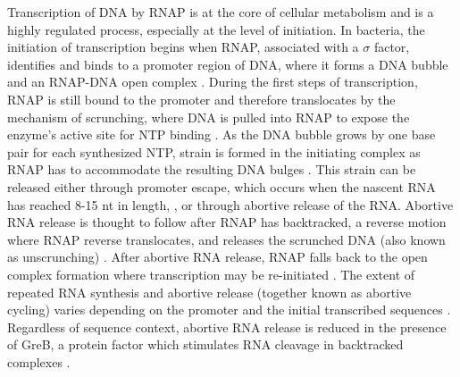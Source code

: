 %
Transcription of DNA by RNAP is at the core of cellular metabolism and is a
highly regulated process, especially at the level of initiation. In bacteria,
the initiation of transcription begins when RNAP, associated with a $\sigma$
factor, identifies and binds to a promoter region of DNA, where it forms a DNA
bubble and an RNAP-DNA open complex \cite{saecker_mechanism_2011}. During the
first steps of transcription, RNAP is still bound to the promoter and
therefore translocates by the mechanism of scrunching, where DNA is pulled
into RNAP to expose the enzyme's active site for NTP binding
\cite{revyakin_abortive_2006, kapanidis_initial_2006}. As the DNA bubble grows
by one base pair for each synthesized NTP, strain is formed in the initiating
complex as RNAP has to accommodate the resulting DNA bulges
\cite{straney_stressed_1987, kapanidis_initial_2006,
winkelman_crosslink_2015}. This strain can be released either through promoter
escape, which occurs when the nascent RNA has
reached 8-15 nt in length, \cite{carpousis_cycling_1980,
hsu_vitro_2003, tang_real-time_2009, hsu_initial_2006}, or through abortive
release of the RNA. Abortive RNA release is thought to follow after RNAP has
backtracked, a reverse motion where RNAP reverse translocates, and releases the scrunched
DNA (also known as unscrunching) \cite{hsu_escherichia_1995,
feng_grea-induced_1994, hsu_initial_2006}. After abortive RNA release, RNAP
falls back to the open complex formation where transcription may be
re-initiated \cite{carpousis_cycling_1980}. The extent of repeated RNA
synthesis and abortive release (together known as abortive cycling) varies
depending on the promoter and the
initial transcribed sequences \cite{hsu_initial_2006, hsu_promoter_2002,
vo_vitro_2003, skancke_sequence-dependent_2015}. Regardless of sequence
context, abortive RNA release is reduced in the
presence of GreB, a protein factor which stimulates RNA cleavage in
backtracked complexes \cite{hsu_initial_2006}.

